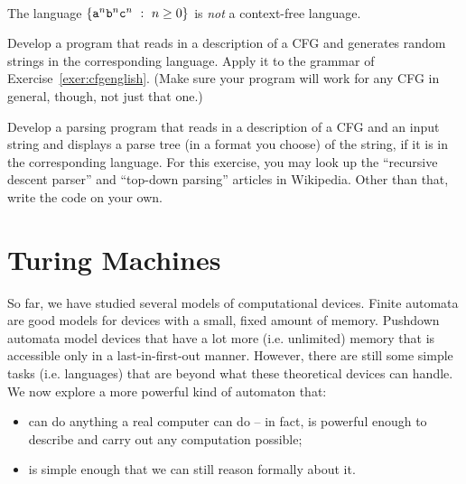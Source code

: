 \documentclass[twoside,letterpaper,openany]{book}
\begin{document}
~

\begin{thm}
The language $\left\lbrace \texttt{a}^n \texttt{b}^n \texttt{c}^n\ :\  n \geq 0  \right\rbrace$ is \emph{not} a context-free language.
\end{thm}

\begin{progexer}\happymac
Develop a program that reads in a description of a CFG and generates random strings in the corresponding language. Apply it to the grammar of Exercise~\ref{exer:cfgenglish}. (Make sure your program will work for any CFG in general, though, not just that one.)
\end{progexer}

\begin{progexer}\happymac
Develop a parsing program that reads in a description of a CFG and an input string and displays a parse tree (in a format you choose) of the string, if it is in the corresponding language. For this exercise, you may look up the ``recursive descent parser'' and ``top-down parsing'' articles in Wikipedia. Other than that, write the code on your own.
\end{progexer}






\chapter{Turing Machines}

So far, we have studied several models of computational devices. Finite automata are good models for devices with a small, fixed amount of memory. Pushdown automata model devices that have a lot more (i.e. unlimited) memory that is accessible only in a last-in-first-out manner. However, there are still some simple tasks (i.e. languages) that are beyond what these theoretical devices can handle. We now explore a more powerful kind of automaton that:

\begin{itemize}
\item can do anything a real computer can do -- in fact, is powerful enough to describe and carry out any computation possible;
\item is simple enough that we can still reason formally about it.
\end{itemize}

~

\newcommand\qaccept{q_\textrm{\small accept}}
\newcommand\qreject{q_\textrm{\small reject}}
\newcommand\blanksymbol\sqcup
\newcommand\tmL{\textrm{L}}
\newcommand\tmR{\textrm{R}}
\end{document}

